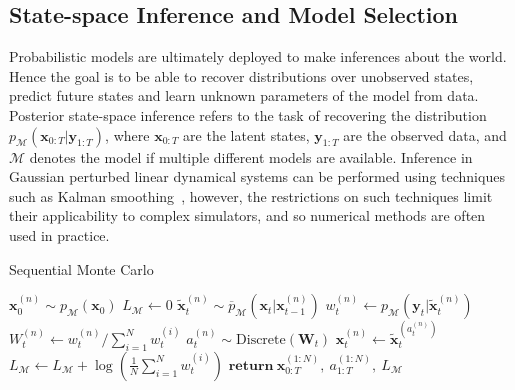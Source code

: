 \subsection{State-space Inference and Model Selection}
Probabilistic models are ultimately deployed to make inferences about the world.
Hence the goal is to be able to recover distributions over unobserved states, predict future states and learn unknown parameters of the model from data.
Posterior state-space inference refers to the task of recovering the distribution $p_{\mathcal{M}}(\mathbf{x}_{0:T} | \mathbf{y}_{1:T})$, where $\mathbf{x}_{0:T}$ are the latent states, $\mathbf{y}_{1:T}$ are the observed data, and $\mathcal{M}$ denotes the model if multiple different models are available.
Inference in Gaussian perturbed linear dynamical systems can be performed using techniques such as Kalman smoothing~\citep{kalman1960new}, however, the restrictions on such techniques limit their applicability to complex simulators, and so numerical methods are often used in practice. 

\begin{algorithm}[t]
 \caption{Sequential Monte Carlo}\label{alg:meth:smc_p}
 \begin{algorithmic}[1]
        \State $\mathbf{x}_0^{(n)} \sim p_{\mathcal{M}}(\mathbf{x}_0)$ 
    \EndFor
    \State $L_{\mathcal{M}} \gets 0$  
          \State $\tilde{\mathbf{x}}_t^{(n)} \sim \overline{p}_{\mathcal{M}}\left(\mathbf{x}_t | \mathbf{x}_{t-1}^{(n)}\right)$  \label{alg:meth:smc_p:p} 
          \State $w^{(n)}_t \gets p_{\mathcal{M}}\left(\mathbf{y}_t | \tilde{\mathbf{x}}_t^{(n)}\right)$  \label{alg:meth:smc_p:w}
        \EndFor
         
          \State $W^{(n)}_t \gets w^{(n)}_t / \sum_{i=1}^N w^{(i)}_t$ 
        \EndFor
         
          \State $a^{(n)}_t \sim \text{Discrete}\left(\mathbf{W}_t\right)$ \label{alg:meth:smc_p:a}
          \State $\mathbf{x}_{t}^{(n)} \gets \tilde{\mathbf{x}}_{t}^{\left(a^{(n)}_t\right)}$ 
        \EndFor
        \State $L_{\mathcal{M}} \gets L_{\mathcal{M}} + \log\left(\frac{1}{N}\sum_{i=1}^N w^{(i)}_t\right)$ \label{alg:meth:smc_p:e}
     \EndFor
     \State $\textbf{return}\ \mathbf{x}^{(1:N)}_{0:T},\ a_{1:T}^{(1:N)},\ L_{\mathcal{M}}$ 
  \EndProcedure
 \end{algorithmic}
\end{algorithm}

